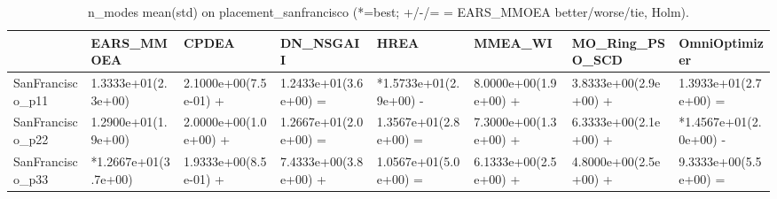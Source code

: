\begin{table}[t]
\centering
\caption{n_modes mean(std) on placement_sanfrancisco (*=best; +/-/= = EARS_MMOEA better/worse/tie, Holm).}
\label{tab:placement_sanfrancisco_n_modes}
\begin{tabular}{llllllll}
\toprule
 & EARS\_MMOEA & CPDEA & DN\_NSGAII & HREA & MMEA\_WI & MO\_Ring\_PSO\_SCD & OmniOptimizer \\
\midrule
SanFrancisco\_p11 & 1.3333e+01(2.3e+00) & 2.1000e+00(7.5e-01) + & 1.2433e+01(3.6e+00) = & *1.5733e+01(2.9e+00) - & 8.0000e+00(1.9e+00) + & 3.8333e+00(2.9e+00) + & 1.3933e+01(2.7e+00) = \\
SanFrancisco\_p22 & 1.2900e+01(1.9e+00) & 2.0000e+00(1.0e+00) + & 1.2667e+01(2.0e+00) = & 1.3567e+01(2.8e+00) = & 7.3000e+00(1.3e+00) + & 6.3333e+00(2.1e+00) + & *1.4567e+01(2.0e+00) - \\
SanFrancisco\_p33 & *1.2667e+01(3.7e+00) & 1.9333e+00(8.5e-01) + & 7.4333e+00(3.8e+00) + & 1.0567e+01(5.0e+00) = & 6.1333e+00(2.5e+00) + & 4.8000e+00(2.5e+00) + & 9.3333e+00(5.5e+00) = \\
\bottomrule
\end{tabular}
\end{table}
